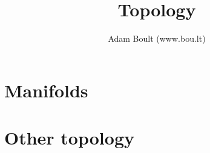 \documentclass[oneside]{book}
\begin{document}
\author{Adam Boult (www.bou.lt)}
\title{Topology}
\maketitle

\setcounter{tocdepth}{0}
\tableofcontents



\part{Manifolds}






\part{Other topology}




\end{document}
